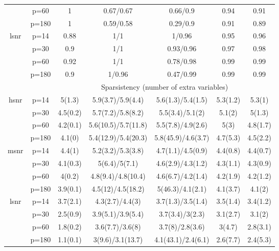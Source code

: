 \begin{table}[ht]
{\begin{tabular}{|c|c|ccccc|}
   & p=60 & 1 & 0.67/0.67 & 0.66/0.9 & 0.94 & 0.91 \\ 
   & p=180 & 1 & 0.59/0.58 & 0.29/0.9 & 0.91 & 0.89 \\ 
  \midrule\multirow{4}[2]{*}{lsnr} & p=14 & 0.88 & 1/1 & 1/0.96 & 0.95 & 0.96 \\ 
   & p=30 & 0.9 & 1/1 & 0.93/0.96 & 0.97 & 0.98 \\ 
   & p=60 & 0.92 & 1/1 & 0.78/0.98 & 0.99 & 0.99 \\ 
   & p=180 & 0.9 & 1/0.96 & 0.47/0.99 & 0.99 & 0.99 \\ 
   \midrule 
 \multicolumn{1}{|c}{} &       & \multicolumn{5}{c|}{Sparsistency (number of extra variables)} \\
\midrule\multirow{4}[2]{*}{hsnr} & p=14 & 5(1.3) & 5.9(3.7)/5.9(4.4) & 5.6(1.3)/5.4(1.5) & 5.3(1.2) & 5.3(1) \\ 
   & p=30 & 4.5(0.2) & 5.7(7.2)/5.8(8.2) & 5.5(3.4)/5.1(2) & 5.1(2) & 5(1.3) \\ 
   & p=60 & 4.2(0.1) & 5.6(10.5)/5.7(11.8) & 5.5(7.8)/4.9(2.6) & 5(3) & 4.8(1.7) \\ 
   & p=180 & 4.1(0) & 5.4(12.9)/5.4(20.3) & 5.8(45.9)/4.6(3.7) & 4.7(5.3) & 4.5(2.2) \\ 
  \midrule\multirow{4}[2]{*}{msnr} & p=14 & 4.4(1) & 5.2(3.2)/5.3(3.8) & 4.7(1.1)/4.5(0.9) & 4.4(0.8) & 4.4(0.7) \\ 
   & p=30 & 4.1(0.3) & 5(6.4)/5(7.1) & 4.6(2.9)/4.3(1.2) & 4.3(1.1) & 4.3(0.9) \\ 
   & p=60 & 4(0.2) & 4.8(9.4)/4.8(10.4) & 4.6(6.7)/4.2(1.4) & 4.2(1.9) & 4.2(1.2) \\ 
   & p=180 & 3.9(0.1) & 4.5(12)/4.5(18.2) & 5(46.3)/4.1(2.1) & 4.1(3.7) & 4.1(2) \\ 
  \midrule\multirow{4}[2]{*}{lsnr} & p=14 & 3.7(2.1) & 4.3(2.7)/4.4(3) & 3.7(1.3)/3.5(1.4) & 3.5(1.4) & 3.4(1.2) \\ 
   & p=30 & 2.5(0.9) & 3.9(5.1)/3.9(5.4) & 3.7(3.4)/3(2.3) & 3.1(2.7) & 3.1(2) \\ 
   & p=60 & 1.8(0.2) & 3.6(7.7)/3.6(8) & 3.7(8)/2.8(3.6) & 3(4.7) & 2.8(3.1) \\ 
   & p=180 & 1.1(0.1) & 3(9.6)/3.1(13.7) & 4.1(43.1)/2.4(6.1) & 2.6(7.7) & 2.4(5.3) \\ 
   \bottomrule 
\end{tabular}
}
\end{table}
